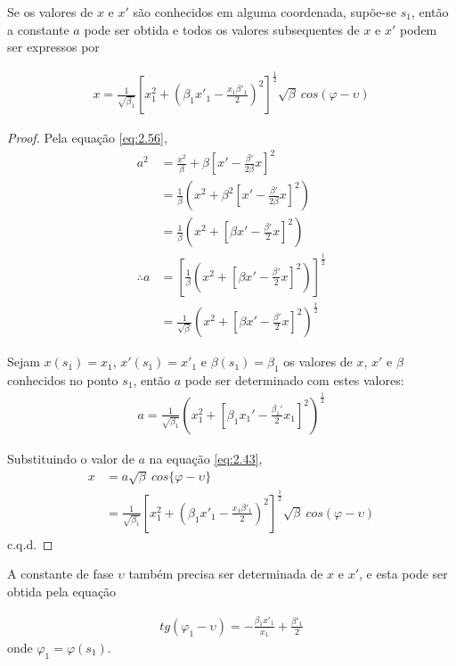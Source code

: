 Se os valores de $x$ e $x'$ são conhecidos em alguma coordenada, supõe-se $s_1$, então a constante $a$ pode ser obtida e todos os valores subsequentes de $x$ e $x'$ podem ser expressos por
	
\begin{align}
	x = \frac{1}{\sqrt{\beta_1}}\left[x_1^2+\left(\beta_1x'_1-\frac{x_1\beta'_1}{2}\right)^2\right]^\frac{1}{2}\sqrt{\beta}\ cos(\varphi-\upsilon)\label{eq:2.57}
\end{align}
	
\begin{proof}
	Pela equação \eqref{eq:2.56},
	\begin{align*}
        a^2 &= \frac{x^2}{\beta} + \beta\left[x'-\frac{\beta'}{2\beta}x\right]^2\\
        	&= \frac{1}{\beta}\left(x^2 + \beta^2\left[x'-\frac{\beta'}{2\beta}x\right]^2\right)\\
        	&= \frac{1}{\beta}\left(x^2 + \left[\beta x'-\frac{\beta'}{2}x\right]^2\right)\\
        \therefore a &= \left[\frac{1}{\beta}\left(x^2 + \left[\beta x'-\frac{\beta'}{2}x\right]^2\right)\right]^\frac{1}{2}\\
        	&= \frac{1}{\sqrt{\beta}}\left(x^2 + \left[\beta x'-\frac{\beta'}{2}x\right]^2\right)^\frac{1}{2}
	\end{align*}
	
	Sejam $x(s_1)=x_1$, $x'(s_1)=x'_1$ e $\beta(s_1)=\beta_1$ os valores de $x$, $x'$ e $\beta$ conhecidos no ponto $s_1$, então $a$ pode ser determinado com estes valores:
	\begin{align*}
		a = \frac{1}{\sqrt{\beta_1}}\left(x_1^2 + \left[\beta_1 x_1'-\frac{\beta_1'}{2}x_1\right]^2\right)^\frac{1}{2}
	\end{align*}
	
	Substituindo o valor de $a$ na equação \eqref{eq:2.43},
	\begin{align*}
		x &= a\sqrt{\beta}\ cos\{\varphi-\upsilon\}\\
		  &= \frac{1}{\sqrt{\beta_1}}\left[x_1^2+\left(\beta_1x'_1-\frac{x_1\beta'_1}{2}\right)^2\right]^\frac{1}{2}\sqrt{\beta}\ cos(\varphi-\upsilon)
	\end{align*}
	c.q.d.
\end{proof}
	
A constante de fase $\upsilon$ também precisa ser determinada de $x$ e $x'$, e esta pode ser obtida pela equação
	
\begin{align}
	tg(\varphi_1 - \upsilon) = -\frac{\beta_1 x'_1}{x_1}+\frac{\beta'_1}{2}
\end{align}
onde $\varphi_1 = \varphi(s_1)$.
	
